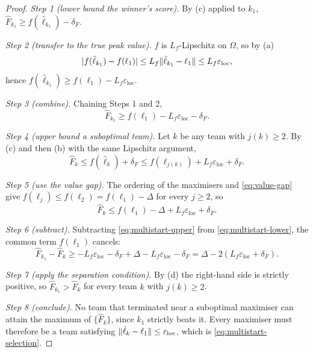 \documentclass[11pt,a4paper]{article}
\theoremstyle{plain}
\theoremstyle{definition}
\DeclarePairedDelimiter{\norm}{\lVert}{\rVert}
\DeclarePairedDelimiter{\abs}{\lvert}{\rvert}
\begin{document}
\begin{proof}
\emph{Step 1 (lower bound the winner's score).} By (c) applied to $k_1$,
$\hat F_{k_1}\geq f(\hat\ell_{k_1})-\delta_F$.

\emph{Step 2 (transfer to the true peak value).} $f$ is $L_f$-Lipschitz on $\Omega$, so by (a)
\begin{equation*}
    \abs{f(\hat\ell_{k_1})-f(\ell_1)}
    \leq L_f\norm{\hat\ell_{k_1}-\ell_1}
    \leq L_f\varepsilon_{\mathrm{loc}},
\end{equation*}
hence $f(\hat\ell_{k_1})\geq f(\ell_1)-L_f\varepsilon_{\mathrm{loc}}$.

\emph{Step 3 (combine).} Chaining Steps 1 and 2,
\begin{equation}\label{eq:multistart-lower}
    \hat F_{k_1}\geq f(\ell_1)-L_f\varepsilon_{\mathrm{loc}}-\delta_F .
\end{equation}

\emph{Step 4 (upper bound a suboptimal team).} Let $k$ be any team with $j(k)\geq2$. By (c) and
then (b) with the same Lipschitz argument,
\begin{equation*}
    \hat F_k\leq f(\hat\ell_k)+\delta_F
    \leq f\!\left(\ell_{j(k)}\right)+L_f\varepsilon_{\mathrm{loc}}+\delta_F .
\end{equation*}

\emph{Step 5 (use the value gap).} The ordering of the maximisers and
\eqref{eq:value-gap} give $f(\ell_{j})\leq f(\ell_2)=f(\ell_1)-\Delta$ for every $j\geq2$, so
\begin{equation}\label{eq:multistart-upper}
    \hat F_k\leq f(\ell_1)-\Delta+L_f\varepsilon_{\mathrm{loc}}+\delta_F .
\end{equation}

\emph{Step 6 (subtract).} Subtracting \eqref{eq:multistart-upper} from
\eqref{eq:multistart-lower}, the common term $f(\ell_1)$ cancels:
\begin{equation*}
    \hat F_{k_1}-\hat F_k
    \geq-L_f\varepsilon_{\mathrm{loc}}-\delta_F
    +\Delta-L_f\varepsilon_{\mathrm{loc}}-\delta_F
    =\Delta-2\left(L_f\varepsilon_{\mathrm{loc}}+\delta_F\right).
\end{equation*}

\emph{Step 7 (apply the separation condition).} By (d) the right-hand side is strictly positive,
so $\hat F_{k_1}>\hat F_k$ for every team $k$ with $j(k)\geq2$.

\emph{Step 8 (conclude).} No team that terminated near a suboptimal maximiser can attain the
maximum of $\{\hat F_k\}$, since $k_1$ strictly beats it. Every maximiser must therefore be a
team satisfying $\norm{\hat\ell_k-\ell_1}\leq\varepsilon_{\mathrm{loc}}$, which is
\eqref{eq:multistart-selection}.
\end{proof}
\end{document}
